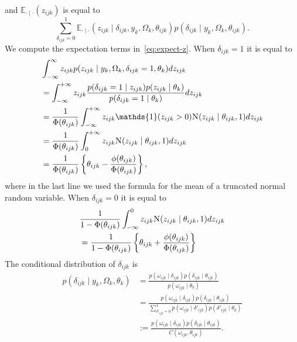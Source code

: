 \documentclass[a4paper, 11pt, oneside]{report}
\newcommand{\E}{\mathbb{E}}
\newcommand{\1}{\mathds{1}}
\newcommand{\Nor}{\textsc{N}}
\begin{document}
and $\E_{\cdot \mid \cdot}(z_{ijk})$ is equal to
\begin{equation}\label{eq:expect-z}
	\sum_{\delta_{ijk} = 0}^1 \E_{\cdot \mid \cdot}\left(z_{ijk} \mid \delta_{ijk}, y_k, \Omega_k, \theta_{ijk}\right) p(\delta_{ijk} \mid y_k, \Omega_k, \theta_{ijk}).
\end{equation}
We compute the expectation terms in~\eqref{eq:expect-z}. When $\delta_{ijk} = 1$ it is equal to
\begin{align*}
	 & \int_{-\infty}^\infty z_{ijk} p(z_{ijk} \mid y_k, \Omega_k, \delta_{ijk} = 1, \theta_k) dz_{ijk}                                               \\
	 & = \int_{-\infty}^{+\infty} z_{ijk} \frac{p(\delta_{ijk} = 1 \mid z_{ijk}) p(z_{ijk} \mid \theta_k)}{p(\delta_{ijk} = 1 \mid \theta_k)}dz_{ijk} \\
	 & = \frac{1}{\Phi(\theta_{ijk})} \int_{-\infty}^{+\infty} z_{ijk} \1(z_{ijk} > 0) \Nor(z_{ijk} \mid \theta_{ijk}, 1) dz_{ijk}                    \\
	 & = \frac{1}{\Phi(\theta_{ijk})} \int_0^{+\infty} z_{ijk} \Nor(z_{ijk} \mid \theta_{ijk}, 1)dz_{ijk}                                             \\
	 & = \frac{1}{\Phi(\theta_{ijk})} \left\{\theta_{ijk} - \frac{\phi(\theta_{ijk})}{\Phi(\theta_{ijk})}\right\},
\end{align*}
where in the last line we used the formula for the mean of a truncated normal random variable.
When $\delta_{ijk} = 0$ it is equal to
\begin{align*}
	 & \frac{1}{1 - \Phi(\theta_{ijk})} \int_{-\infty}^0 z_{ijk} \Nor(z_{ijk} \mid \theta_{ijk}, 1) dz_{ijk}          \\
	 & = \frac{1}{1 - \Phi(\theta_{ijk})} \left\{\theta_{ijk} + \frac{\phi(\theta_{ijk})}{\Phi(\theta_{ijk})}\right\}
\end{align*}
The conditional distribution of $\delta_{ijk}$ is
\begin{align}
	p(\delta_{ijk} \mid y_k, \Omega_k, \theta_k)
	 & = \frac{p(\omega_{ijk} \mid \delta_{ijk}) p(\delta_{ijk} \mid \theta_{ijk})}
	{p(\omega_{ijk} \mid \theta_k)}                                                  \\
	 & = \frac{p(\omega_{ijk} \mid \delta_{ijk}) p(\delta_{ijk} \mid \theta_{ijk})}
	{\sum_{\delta'_{ijk} = 0}^1p(\omega_{ijk} \mid \delta'_{ijk})
	p(\delta'_{ijk} \mid \theta_k)}                                                  \\
	 & := \frac{p(\omega_{ijk} \mid \delta_{ijk}) p(\delta_{ijk} \mid \theta_{ijk})}
	{C(\omega_{ijk}, \theta_{ijk})}\label{eq:delta-cond}.
\end{align}
\end{document}
